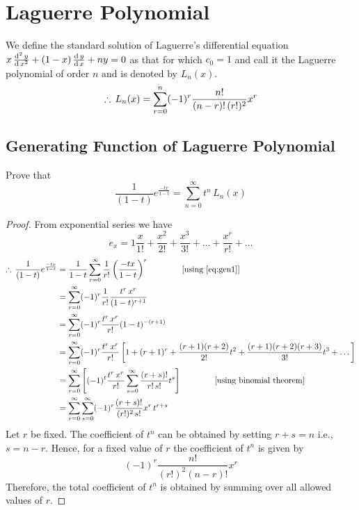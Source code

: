 \documentclass[../main-sheet.tex]{subfiles}
\begin{document}
\chapter{Laguerre Polynomial}
We define the standard solution of Laguerre's differential equation \( x\,\frac{\mathrm{d}^{2}\, y}{\mathrm{d}\, x^{2}}+(1-x)\,\frac{\mathrm{d}\,y}{\mathrm{d}\,x}+ny=0 \) as that for which \( c_0=1 \) and call it the Laguerre polynomial of order \(n\)  and is denoted by \( L_n(x) \).
\[
    \therefore\, L_n(x)=\sum_{r=0}^n (-1)^r \frac{n!}{(n-r)!\,(r!)^2}x^r
\]
\section{Generating Function of Laguerre Polynomial}
\begin{prob}
    Prove that
    \[
        \frac{1}{(1-t)}e^{\frac{-tx}{1-t}}=\sum_{n=0}^\infty t^n\,L_n(x)
    \]
\end{prob}
\begin{proof}
    From exponential series we have
    \begin{equation}
        e_x=1\frac{x}{1!}+\frac{x^2}{2!}+\frac{x^3}{3!}+\dots+\frac{x^r}{r!}+\dots \label{eq:gen1}
    \end{equation}
    \begin{align*}
        \therefore\,\frac{1}{(1-t)}e^{\frac{-tx}{1-t}} & =\frac{1}{1-t}\sum_{r=0}^\infty \frac{1}{r!}\left( \frac{-tx}{1-t} \right)^r \qquad\qquad \text{[using \( \ref{eq:gen1} \)]}                        \\
                                                       & =\sum_{r=0}^\infty (-1)^r \frac{1}{r!} \frac{t^r\,x^r}{(1-t)^{r+1}}                                                                             \\
                                                       & =\sum_{r=0}^\infty (-1)^r \frac{t^r\,x^r}{r!}(1-t)^{-(r+1)}                                                                                     \\
                                                       & =\sum_{r=0}^\infty (-1)^r \frac{t^r\,x^r}{r!}\left[ 1+(r+1)^r+\frac{(r+1)(r+2)}{2!}t^2+\frac{(r+1)(r+2)(r+3)}{3!}t^3+\dots \right]              \\
                                                       & =\sum_{r=0}^\infty\left[ (-1)^t \frac{t^r\,x^r}{r!}\sum_{s=0}^\infty\frac{(r+s)!}{r!\,s!}t^s \right]\qquad\qquad\text{[using binomial theorem]}\\
                                                       &= \sum_{r=0}^\infty\sum_{s=0}^\infty(-1)^r\frac{(r+s)!}{(r!)^2\,s!}x^r\,t^{r+s}
    \end{align*}
    Let \( r \) be fixed. The coefficient of \( t^n \) can be obtained by setting \( r+s=n \) i.e., \( s=n-r \). Hence, for a fixed value of \( r \) the coefficient of \( t^n \) is given by 
    \[
        (-1)^r\frac{n!}{(r!)^2(n-r)!}x^r
    \]
    Therefore, the total coefficient of \( t^n \) is obtained by summing over all allowed values of \( r \).


\end{proof}
\end{document}
